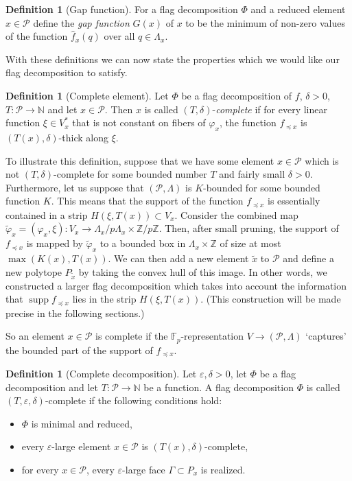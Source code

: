 \documentclass{daj}
\newcommand{\Z}{\mathbb Z}
\newcommand{\N}{\mathbb N}
\newcommand{\FF}{\mathbb F}
\renewcommand{\P}{\mathcal P}
\theoremstyle{definition}
\newtheorem{defi}[theorem]{Definition}
\theoremstyle{remark}
\theoremstyle{definition}
\theoremstyle{definition}
\begin{document}
\begin{defi}[Gap function]
    For a flag decomposition $\Phi$ and a reduced element $x \in \P$ define the {\em gap function} $G(x)$ of $x$ to be the minimum of non-zero values of the function $\hat f_x(q)$ over all $q \in \Lambda_x$. 
\end{defi}


With these definitions we can now state the properties which we would like our flag decomposition to satisfy. 

\begin{defi}[Complete element]
Let $\Phi$ be a flag decomposition of $f$, $\delta > 0$, $T: \P \rightarrow \N$ and let $x \in \P$. Then $x$ is called $(T, \delta)$-{\em complete} if for every linear function $\xi \in V_x^*$ that is not constant on fibers of $\varphi_x$, the function $f_{\preceq x}$ is $(T(x), \delta)$-thick along $\xi$.
\end{defi}

To illustrate this definition, suppose that we have some element $x \in \P$ which is not $(T,\delta)$-complete for some bounded number $T$ and fairly small $\delta>0$. Furthermore, let us suppose that $(\P,\Lambda)$ is $K$-bounded for some bounded function $K$. 
This means that the support of the function $f_{\preceq x}$ is essentially contained in a strip $H(\xi,T(x)) \subset V_x$. Consider the combined map $\tilde \varphi_x=(\varphi_x, \xi): V_x \to \Lambda_x/p\Lambda_x \times \Z/p\Z$. Then, after small pruning, the support of $f_{\preceq x}$ is mapped by $\tilde \varphi_x$ to a bounded box in $\Lambda_x \times \Z$ of size at most $\max(K(x), T(x))$. We can then add a new element $\tilde x$ to $\P$ and define a new polytope $P_{\tilde x}$ by taking the convex hull of this image. In other words, we constructed a larger flag decomposition which takes into account the information that $\operatorname{supp}f_{\preceq x}$ lies in the strip $H(\xi,T(x))$. (This construction will be made precise in the following sections.)

So an element $x\in \P$ is complete if the $\FF_p$-representation $V\to (\P,\Lambda)$ `captures' the bounded part of the support of $f_{\preceq x}$. 

\begin{defi}[Complete decomposition] \label{cmp}
Let $\varepsilon, \delta > 0$, let $\Phi$ be a flag decomposition and let $T:\P\rightarrow \N$ be a function. A flag decomposition $\Phi$ is called $(T, \varepsilon, \delta)$-{\rm complete} if the following conditions hold:
\begin{itemize}
    \item $\Phi$ is minimal and reduced,
    \item every $\varepsilon$-large element $x \in \P$ is $(T(x), \delta)$-complete,
    \item for every $x\in \P$, every $\varepsilon$-large face $\Gamma \subset P_x$ is realized.
\end{itemize}
\end{defi}
\end{document}
